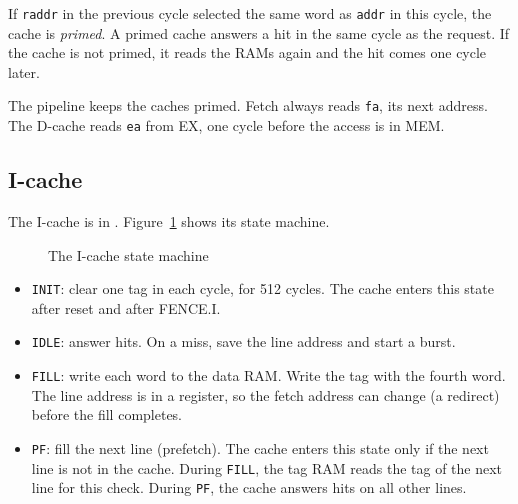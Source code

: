 If \texttt{raddr} in the previous cycle selected the same word as \texttt{addr} in this cycle, the cache is \emph{primed}. A primed cache answers a hit in the same cycle as the request. If the cache is not primed, it reads the RAMs again and the hit comes one cycle later.

The pipeline keeps the caches primed. Fetch always reads \texttt{fa}, its next address. The D-cache reads \texttt{ea} from EX, one cycle before the access is in MEM.

\subsection{I-cache}

The I-cache is in . Figure~\ref{fig:icfsm} shows its state machine.

\begin{figure}[H]
  \centering
  \caption{The I-cache state machine}
  \label{fig:icfsm}
\end{figure}

\begin{itemize}
  \item \texttt{INIT}: clear one tag in each cycle, for 512 cycles. The cache enters this state after reset and after FENCE.I.
  \item \texttt{IDLE}: answer hits. On a miss, save the line address and start a burst.
  \item \texttt{FILL}: write each word to the data RAM. Write the tag with the fourth word. The line address is in a register, so the fetch address can change (a redirect) before the fill completes.
  \item \texttt{PF}: fill the next line (prefetch). The cache enters this state only if the next line is not in the cache. During \texttt{FILL}, the tag RAM reads the tag of the next line for this check. During \texttt{PF}, the cache answers hits on all other lines.
\end{itemize}

